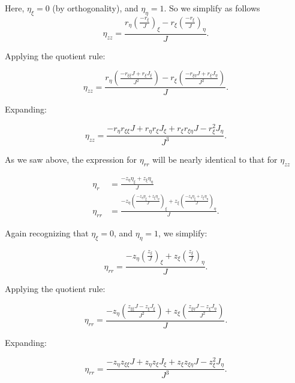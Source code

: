 \noindent Here, \(\eta_\xi = 0\) (by orthogonality), and \(\eta_\eta = 1\).
%
So we simplify as follows
\begin{equation}
	\eta_{zz} = \frac{r_\eta \left(\frac{- r_\xi}{J}\right)_\xi - r_\xi \left(\frac{- r_\xi}{J}\right)_\eta}{J}.
\end{equation}

\noindent Applying the quotient rule:

\begin{equation}
	\eta_{zz} = \frac{r_\eta \left(\frac{- r_{\xi\xi}J + r_\xi J_\xi}{J^2}\right) - r_\xi \left(\frac{- r_{\xi\eta} J + r_\xi J_\eta}{J^2}\right)}{J}.
\end{equation}

\noindent Expanding:

\begin{equation}
	\eta_{zz} = \frac{-r_\eta r_{\xi\xi}J + r_\eta r_\xi J_\xi + r_\xi r_{\xi\eta} J - r_\xi^2 J_\eta}{J^3}.
\end{equation}

\noindent As we saw above, the expression for \(\eta_{rr}\) will be nearly identical to that for \(\eta_{zz}\)

\begin{align}
	\eta_r &= \frac{-z_\eta \eta_\xi + z_\xi \eta_\eta}{J} \\
	\eta_{rr} &= \frac{-z_\eta \left(\frac{-z_\eta \eta_\xi + z_\xi \eta_\eta}{J}\right)_\xi + z_\xi \left(\frac{-z_\eta \eta_\xi + z_\xi \eta_\eta}{J}\right)_\eta}{J}.
\end{align}

\noindent Again recognizing that \(\eta_\xi = 0\), and \(\eta_\eta = 1\), we simplify:

\begin{equation}
	\eta_{rr} = \frac{-z_\eta \left(\frac{z_\xi }{J}\right)_\xi + z_\xi \left(\frac{z_\xi}{J}\right)_\eta}{J}.
\end{equation}

\noindent Applying the quotient rule:

\begin{equation}
	\eta_{rr} = \frac{-z_\eta \left(\frac{z_{\xi\xi} J - z_\xi J_\xi}{J^2}\right) + z_\xi \left(\frac{z_{\xi\eta}J - z_\xi J_\eta}{J^2}\right)}{J}.
\end{equation}

\noindent Expanding:

\begin{equation}
	\label{eqn:etarrpause1}
	\eta_{rr} =  \frac{-z_\eta z_{\xi\xi} J + z_\eta z_\xi J_\xi + z_\xi z_{\xi\eta}J - z_\xi^2 J_\eta}{J^3}.
\end{equation}


